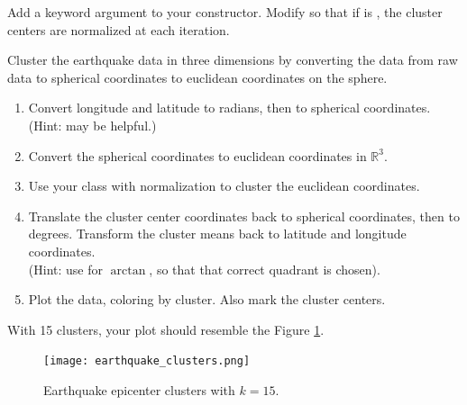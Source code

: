 \begin{problem}
Add a keyword argument  to your  constructor.
Modify  so that if  is , the cluster centers are normalized at each iteration.

Cluster the earthquake data in three dimensions by converting the data from raw data to spherical coordinates to euclidean coordinates on the sphere.
\begin{enumerate}
\item Convert longitude and latitude to radians, then to spherical coordinates.
\\(Hint:  may be helpful.)
\item Convert the spherical coordinates to euclidean coordinates in $\mathbb{R}^3$.
\item Use your  class with normalization to cluster the euclidean coordinates.
\item Translate the cluster center coordinates back to spherical coordinates, then to degrees.
Transform the cluster means back to latitude and longitude coordinates.
\\(Hint: use  for $\arctan$, so that that correct quadrant is chosen).
\item Plot the data, coloring by cluster.
Also mark the cluster centers.
\end{enumerate}
With 15 clusters, your plot should resemble the Figure \ref{fig:earthquakeclusters}.
\end{problem}

\begin{figure}[H]
    \centering
    \texttt{[image: earthquake\_clusters.png]}
    \caption{Earthquake epicenter clusters with $k = 15$.}
    \label{fig:earthquakeclusters}
\end{figure}


